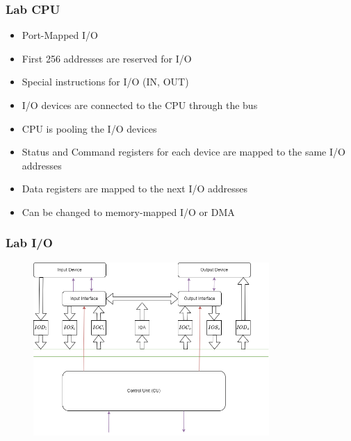 \begin{frame}
    \frametitle{Lab CPU}
    \begin{itemize}
        \item Port-Mapped I/O
        \item First 256 addresses are reserved for I/O
        \item Special instructions for I/O (IN, OUT)
        \item I/O devices are connected to the CPU through the bus
        \item CPU is pooling the I/O devices
        \item Status and Command registers for each device are mapped to the same I/O addresses
        \item Data registers are mapped to the next I/O addresses
        \item Can be changed to memory-mapped I/O or DMA
    \end{itemize}
\end{frame}

\begin{frame}
    \frametitle{Lab I/O}
    \begin{figure}
        \centering
        \includegraphics[width=0.8\textwidth]{media/io.png}
    \end{figure}
\end{frame}

